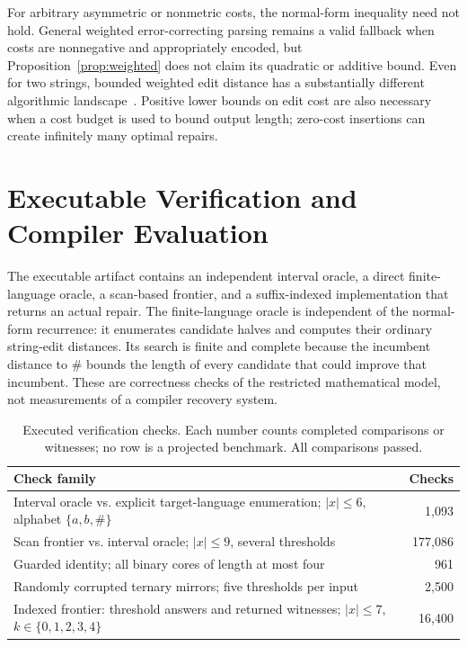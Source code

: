 \documentclass[sigconf,screen]{acmart}
\theoremstyle{definition}
\begin{document}
For arbitrary asymmetric or nonmetric costs, the normal-form inequality need not hold. General weighted error-correcting parsing remains a valid fallback when costs are nonnegative and appropriately encoded, but Proposition~\ref{prop:weighted} does not claim its quadratic or additive bound. Even for two strings, bounded weighted edit distance has a substantially different algorithmic landscape~\cite{cassis2023}. Positive lower bounds on edit cost are also necessary when a cost budget is used to bound output length; zero-cost insertions can create infinitely many optimal repairs.

\section{Executable Verification and Compiler Evaluation}\label{sec:verification}
The executable artifact contains an independent interval oracle, a direct finite-language oracle, a scan-based frontier, and a suffix-indexed implementation that returns an actual repair. The finite-language oracle is independent of the normal-form recurrence: it enumerates candidate halves and computes their ordinary string-edit distances. Its search is finite and complete because the incumbent distance to $\#$ bounds the length of every candidate that could improve that incumbent. These are correctness checks of the restricted mathematical model, not measurements of a compiler recovery system.

\begin{table}[t]
\caption{Executed verification checks. Each number counts completed comparisons or witnesses; no row is a projected benchmark. All comparisons passed.}
\label{tab:checks}
\small
\begin{tabularx}{\columnwidth}{@{}X r@{}}
\toprule
Check family & Checks\\
\midrule
Interval oracle vs. explicit target-language enumeration; $|x|\le6$, alphabet $\{a,b,\#\}$ & 1,093\\
Scan frontier vs. interval oracle; $|x|\le9$, several thresholds & 177,086\\
Guarded identity; all binary cores of length at most four & 961\\
Randomly corrupted ternary mirrors; five thresholds per input & 2,500\\
Indexed frontier: threshold answers and returned witnesses; $|x|\le7$, $k\in\{0,1,2,3,4\}$ & 16,400\\
\bottomrule
\end{tabularx}
\end{table}
\end{document}
